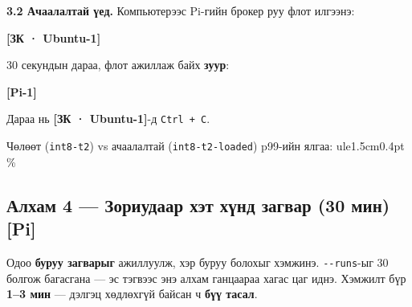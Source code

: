 \textbf{3.2 Ачаалалтай үед.} Компьютерээс Pi-гийн брокер руу флот илгээнэ:

\textbf{{[}ЗК · Ubuntu-1{]}}

\begin{Shaded}
\begin{Highlighting}[]
\OperatorTok{\textless{}}\OperatorTok{\textgreater{}}
\end{Highlighting}
\end{Shaded}

30 секундын дараа, флот ажиллаж байх \textbf{зуур}:

\textbf{{[}Pi-1{]}}

\begin{Shaded}
\begin{Highlighting}[]
 \KeywordTok{\textbackslash{}}
    \KeywordTok{\textbackslash{}}
\end{Highlighting}
\end{Shaded}

Дараа нь \textbf{{[}ЗК · Ubuntu-1{]}}-д \texttt{Ctrl\ +\ C}.

Чөлөөт (\texttt{int8-t2}) vs ачаалалтай (\texttt{int8-t2-loaded}) p99-ийн ялгаа: ule{1.5cm}{0.4pt} \%

\hypertarget{ux430ux43bux445ux430ux43c-4-ux437ux43eux440ux438ux443ux434ux430ux430ux440-ux445ux44dux442-ux445ux4afux43dux434-ux437ux430ux433ux432ux430ux440-30-ux43cux438ux43d-pi}{%
\subsection{Алхам 4 --- Зориудаар хэт хүнд загвар (30 мин) {[}Pi{]}}\label{ux430ux43bux445ux430ux43c-4-ux437ux43eux440ux438ux443ux434ux430ux430ux440-ux445ux44dux442-ux445ux4afux43dux434-ux437ux430ux433ux432ux430ux440-30-ux43cux438ux43d-pi}}

Одоо \textbf{буруу загварыг} ажиллуулж, хэр буруу болохыг хэмжинэ. \texttt{-\/-runs}-ыг 30 болгож багасгана --- эс тэгвээс энэ алхам ганцаараа хагас цаг иднэ. Хэмжилт бүр \textbf{1--3 мин} --- дэлгэц хөдлөхгүй байсан ч \textbf{бүү тасал}.


